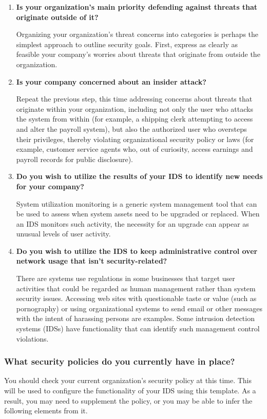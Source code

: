 \documentclass[12pt]{article}
\begin{document}
    \begin{enumerate}
        \item \textbf{Is your organization's main priority defending against threats that originate outside of it?}
        \par Organizing your organization's threat concerns into categories is perhaps the simplest approach to outline security goals. First, express as clearly as feasible your company's worries about threats that originate from outside the organization.
        
        \item \textbf{Is your company concerned about an insider attack?}
        \par Repeat the previous step, this time addressing concerns about threats that originate within your organization, including not only the user who attacks the system from within (for example, a shipping clerk attempting to access and alter the payroll system), but also the authorized user who oversteps their privileges, thereby violating organizational security policy or laws (for example, customer service agents who, out of curiosity, access earnings and payroll records for public disclosure).
        
        \item \textbf{Do you wish to utilize the results of your IDS to identify new needs for your company?}
        \par System utilization monitoring is a generic system management tool that can be used to assess when system assets need to be upgraded or replaced. When an IDS monitors such activity, the necessity for an upgrade can appear as unusual levels of user activity.
        
        \item \textbf{Do you wish to utilize the IDS to keep administrative control over network usage that isn't security-related?}
        \par There are systems use regulations in some businesses that target user activities that could be regarded as human management rather than system security issues. Accessing web sites with questionable taste or value (such as pornography) or using organizational systems to send email or other messages with the intent of harassing persons are examples. Some intrusion detection systems (IDSs) have functionality that can identify such management control violations.
    \end{enumerate}
    \clearpage
    \subsubsection{What security policies do you currently have in place?}
    \par You should check your current organization's security policy at this time. This will be used to configure the functionality of your IDS using this template. As a result, you may need to supplement the policy, or you may be able to infer the following elements from it.
    
\end{document}
